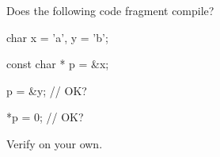 Does the following code fragment compile?



\begin{consolethree}[escapeinside=||]

char x = 'a', y = 'b';

const char * p = &x;

p = &y;      // OK?

*p = 0;      // OK?

\end{consolethree}

Verify on your own.

